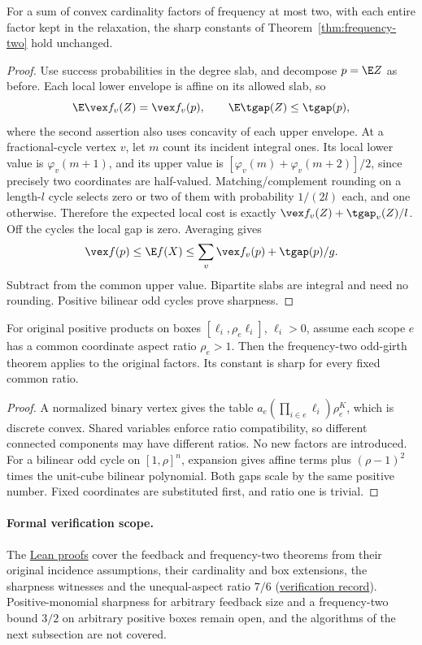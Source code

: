 \begin{theorem}\label{thm:cardinality-frequency}
For a sum of convex cardinality factors of frequency at most two,
with each entire factor kept in the relaxation, the sharp constants of
Theorem~\ref{thm:frequency-two} hold unchanged.
\end{theorem}
\begin{proof}
Use success probabilities in the degree slab, and decompose $p=\E Z$
as before. Each local lower envelope is affine on its allowed slab, so
\[
 \E\vex f_v(Z)=\vex f_v(p),\qquad \E\tgap(Z)\le\tgap(p),
\]
where the second assertion also uses concavity of each upper envelope.
At a fractional-cycle vertex $v$, let $m$ count its incident integral
ones. Its local lower value is $\varphi_v(m+1)$, and its upper value
is $[\varphi_v(m)+\varphi_v(m+2)]/2$, since precisely two coordinates
are half-valued. Matching/complement rounding on a length-$l$ cycle
selects zero or two of them with probability $1/(2l)$ each, and one
otherwise. Therefore the expected local cost is exactly
$\vex f_v(Z)+\tgap_v(Z)/l$. Off the cycles the local gap is zero.
Averaging gives
\[
 \vex f(p)\le\E f(X)\le\sum_v\vex f_v(p)+\tgap(p)/g.
\]
Subtract from the common upper value. Bipartite slabs are integral and
need no rounding. Positive bilinear odd cycles prove sharpness.
\end{proof}

\begin{corollary}\label{cor:cardinality-box}
For original positive products on boxes $[\ell_i,\rho_e\ell_i]$,
$\ell_i>0$, assume each scope $e$ has a common coordinate aspect ratio
$\rho_e>1$. Then the frequency-two odd-girth theorem applies to the
original factors. Its constant is sharp for every fixed common ratio.
\end{corollary}
\begin{proof}
A normalized binary vertex gives the table
$a_e(\prod_{i\in e}\ell_i)\rho_e^K$, which is discrete convex.
Shared variables enforce ratio compatibility, so different connected
components may have different ratios. No new factors are introduced.
For a bilinear odd cycle on $[1,\rho]^n$, expansion gives affine terms
plus $(\rho-1)^2$ times the unit-cube bilinear polynomial. Both gaps
scale by the same positive number. Fixed coordinates are substituted
first, and ratio one is trivial.
\end{proof}

\paragraph{Formal verification scope.}
The \href{../formal/topics/19-structural-multilinear/COVERAGE.md}{Lean proofs}
cover the feedback and frequency-two theorems from their original
incidence assumptions, their cardinality and box extensions, the sharpness
witnesses and the unequal-aspect ratio $7/6$
(\href{../formal/topics/19-structural-multilinear/VERIFICATION.md}{verification record}).
Positive-monomial sharpness for arbitrary feedback size and a frequency-two
bound $3/2$ on arbitrary positive boxes remain open, and the algorithms of
the next subsection are not covered.

